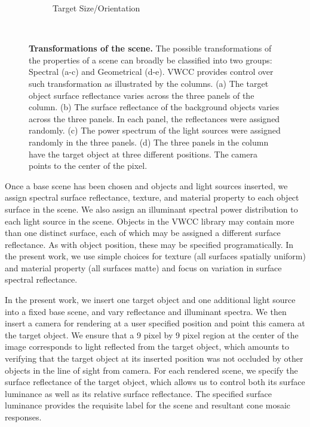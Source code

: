 \documentclass{jov}
\begin{document}
\begin{figure}
\begin{subfigure}[b]{0.18 \textwidth}
        \caption{Target Size/Orientation}
        \label{fig:targetSizeOrientation}
    \end{subfigure}
    ~ %
    \caption{{\bf Transformations of the scene.} The possible transformations of the properties of a scene can broadly be classified into two groups: Spectral (a-c) and Geometrical (d-e). VWCC provides control over such transformation as illustrated by the columns. (a) The target object surface reflectance varies across the three panels of the column. (b) The surface reflectance of the background objects varies across the three panels. In each panel, the reflectances were assigned randomly. (c) The power spectrum of the light sources were assigned randomly in the three panels. (d) The three panels in the column have the target object at three different positions. The camera points to the center of the pixel. }\label{fig:VWCCTransformations}
\end{figure}

Once a base scene has been chosen and objects and light sources inserted, we assign spectral surface reflectance, texture, and material property to each object surface in the scene. We also assign an illuminant spectral power distribution to each light source in the scene. Objects in the VWCC library may contain more than one distinct surface, each of which may be assigned a different surface reflectance. As with object position, these may be specified programatically. In the present work, we use simple choices for texture (all surfaces spatially uniform) and material property (all surfaces matte) and focus on variation in surface spectral reflectance. 

In the present work, we insert one target object and one additional light source into a fixed base scene, and vary reflectance and illuminant spectra. We then insert a camera for rendering at a user specified position and point this camera at the target object. We ensure that a 9 pixel by 9 pixel region at the center of the image corresponds to light reflected from the target object, which amounts to verifying that the target object at its inserted position was not occluded by other objects in the line of sight from camera. For each rendered scene, we specify the surface reflectance of the target object, which allows us to control both its surface luminance as well as its relative surface reflectance. The specified surface luminance provides the requisite label for the scene and resultant cone mosaic responses.
\end{document}

